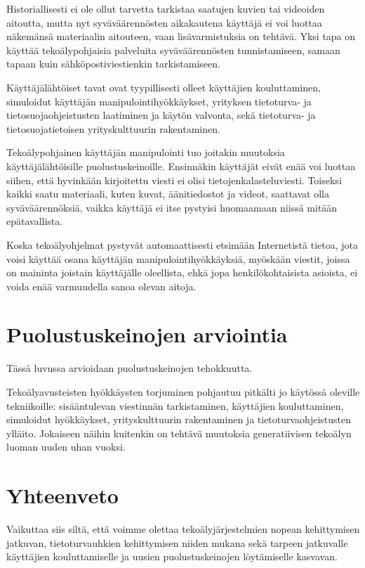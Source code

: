 Historiallisesti ei ole ollut tarvetta tarkistaa saatujen kuvien tai videoiden aitoutta, mutta nyt syväväärennösten aikakautena käyttäjä ei voi luottaa näkemänsä materiaalin aitouteen, vaan lisävarmistuksia on tehtävä. Yksi tapa on käyttää tekoälypohjaisia palveluita syväväärennösten tunnistamiseen, samaan tapaan kuin sähköpostiviestienkin tarkistamiseen.

Käyttäjälähtöiset tavat ovat tyypillisesti olleet käyttäjien kouluttaminen, simuloidut käyttäjän manipulointihyökkäykset, yrityksen tietoturva- ja tietosuojaohjeistusten laatiminen ja käytön valvonta, sekä tietoturva- ja tietosuojatietoisen yrityskulttuurin rakentaminen.

Tekoälypohjainen käyttäjän manipulointi tuo joitakin muutoksia käyttäjälähtöisille puolustuskeinoille. Ensinnäkin käyttäjät eivät enää voi luottaa siihen, että hyvinkään kirjoitettu viesti ei olisi tietojenkalasteluviesti. Toiseksi kaikki saatu materiaali, kuten kuvat, äänitiedostot ja videot, saattavat olla syväväärennöksiä, vaikka käyttäjä ei itse pystyisi huomaamaan niissä mitään epätavallista.

Koska tekoälyohjelmat pystyvät automaattisesti etsimään Internetistä tietoa, jota voisi käyttää osana käyttäjän manipulointihyökkäyksiä, myöskään viestit, joissa on maininta joistain käyttäjälle oleellista, ehkä jopa henkilökohtaisista asioista, ei voida enää varmuudella sanoa olevan aitoja.

\section*{Puolustuskeinojen arviointia}

Tässä luvussa arvioidaan puolustuskeinojen tehokkuutta.

Tekoälyavusteisten hyökkäysten torjuminen pohjautuu pitkälti jo käytössä oleville tekniikoille: sisääntulevan viestinnän tarkistaminen, käyttäjien kouluttaminen, simuloidut hyökkäykset, yrityskulttuurin rakentaminen ja tietoturvaohjeistusten ylläito. Jokaiseen näihin kuitenkin on tehtävä muutoksia generatiivisen tekoälyn luoman uuden uhan vuoksi.


\section*{Yhteenveto}

Vaikuttaa siis siltä, että voimme olettaa tekoälyjärjestelmien nopean kehittymisen jatkuvan, tietoturvauhkien kehittymisen niiden mukana sekä tarpeen jatkuvalle käyttäjien kouluttamiselle ja uusien puolustuskeinojen löytämiselle kasvavan.
